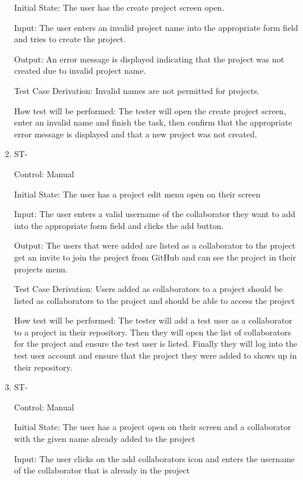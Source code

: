 \documentclass[12pt, titlepage]{article}
\newcounter{TESTID}
\newcommand\TESTNUM{\stepcounter{TESTID}\theTESTID}
\begin{document}
\begin{enumerate}
		Initial State: The user has the create project screen open.
		
		Input: The user enters an invalid project name into the appropriate form field and tries to create the project.
		
		Output: An error message is displayed indicating that the project was not created due to invalid project name. 
		
		Test Case Derivation: Invalid names are not permitted for projects.
		
		How test will be performed: The tester will open the create project screen, enter an invalid name and finish the task, then confirm that the appropriate error message is displayed and that a new project was not created.
		
		\item{ST-\TESTNUM\\}
		
		Control: Manual
		
		Initial State: The user has a project edit menu open on their screen
		
		Input: The user enters a valid username of the collaborator they want to add into the appropriate form field and clicks the add button.
		
		Output: The users that were added are listed as a collaborator to the project get an invite to join the project from GitHub and can see the project in their projects menu.
		
		Test Case Derivation: Users added as collaborators to a project should be listed as collaborators to the project and should be able to access the project
		
		How test will be performed: The tester will add a test user as a collaborator to a project in their repository. Then they will open the list of collaborators for the project and ensure the test user is listed. Finally they will log into the test user account and ensure that the project they were added to shows up in their repository.
		
		\item{ST-\TESTNUM\\}
		
		Control: Manual
		
		Initial State: The user has a project open on their screen and a collaborator with the given name already added to the project
		
		Input: The user clicks on the add collaborators icon and enters the username of the collaborator that is already in the project
		

\end{enumerate}
\end{document}
